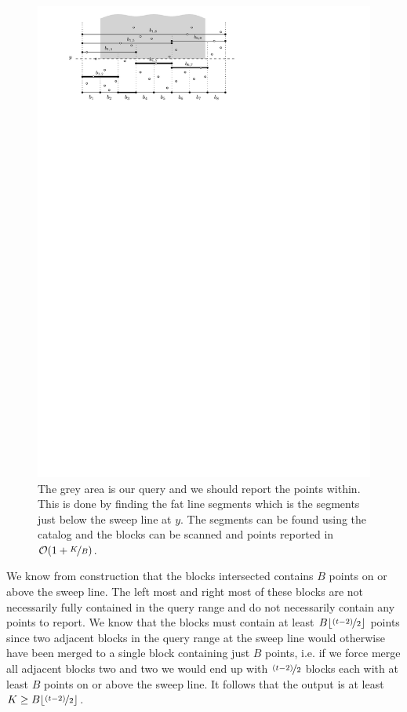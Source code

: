 \documentclass[twoside,11pt,openright]{report}
\begin{document}
\begin{figure}[h]
	\centering
	\includegraphics[scale=1]{../figures/sweep-line-with-query}
	\caption{The grey area is our query and we should report the points within. This is done by finding the fat line segments which is the segments just below the sweep line at $y$. The segments can be found using the catalog and the blocks can be scanned and points reported in $\mathcal{O}(1+\nicefrac{K}{B})$.}
	\label{fig:sweep-line-query}
\end{figure}

We know from construction that the blocks intersected contains $B$ points on or above the sweep line. The left most and right most of these blocks are not necessarily fully contained in the query range and do not necessarily contain any points to report. We know that the blocks must contain at least $B\lfloor \nicefrac{(t-2)}{2}\rfloor$ points since two adjacent blocks in the query range at the sweep line would otherwise have been merged to a single block containing just $B$ points, i.e. if we force merge all adjacent blocks two and two we would end up with $\nicefrac{(t-2)}{2}$ blocks each with at least $B$ points on or above the sweep line. It follows that the output is at least $K \geq B\lfloor \nicefrac{(t-2)}{2}\rfloor$.
\end{document}

